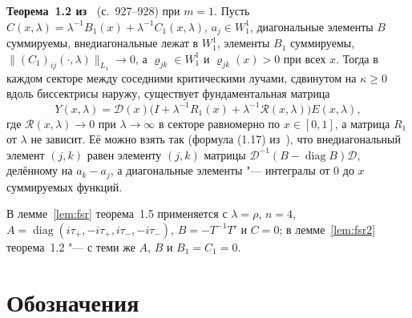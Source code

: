 \documentclass[12pt,a4paper]{article}
\numberwithin{equation}{section}
\theoremstyle{definition}
\newcommand{\norm}[1]{\lVert#1\rVert}
\begin{document}
\smallskip\noindent\textbf{Теорема~1.2 из~\cite{KS2}} (с.~927--928) при $m=1$. Пусть
$C(x,\lambda)=\lambda^{-1}B_1(x)+\lambda^{-1}C_1(x,\lambda)$, $a_j\in W^1_1$, диагональные элементы $B$
суммируемы, внедиагональные лежат в $W^1_1$, элементы $B_1$ суммируемы,
$\norm{(C_1)_{ij}(\cdot,\lambda)}_{L_1}\to0$, а $\varrho_{jk}\in W^1_1$ и $\varrho_{jk}(x)>0$ при всех
$x$. Тогда в каждом секторе между соседними критическими лучами, сдвинутом на $\kappa\ge0$ вдоль
биссектрисы наружу, существует фундаментальная матрица
\[
 Y(x,\lambda)=\mathcal D(x)\bigl(I+\lambda^{-1}R_1(x)+\lambda^{-1}\mathcal R(x,\lambda)\bigr)E(x,\lambda),
\]
где $\mathcal R(x,\lambda)\to0$ при $\lambda\to\infty$ в секторе равномерно по $x\in[0,1]$, а
матрица $R_1$ от $\lambda$ не зависит. Её можно взять так (формула (1.17) из~\cite{KS2}), что
внедиагональный элемент $(j,k)$ равен элементу $(j,k)$ матрицы
$\mathcal D^{-1}(B-\operatorname{diag}B)\mathcal D$, делённому на $a_k-a_j$, а диагональные
элементы "--- интегралы от $0$ до $x$ суммируемых функций.

\smallskip
В лемме~\ref{lem:fsr} теорема~1.5 применяется с $\lambda=\rho$, $n=4$,
$A=\operatorname{diag}(i\tau_+,-i\tau_+,i\tau_-,-i\tau_-)$, $B=-T^{-1}T'$ и $C=0$; в
лемме~\ref{lem:fsr2} теорема~1.2 "--- с теми же $A$, $B$ и $B_1=C_1=0$.

\iffalse
\section{Обозначения}\label{app:not}
\end{document}
